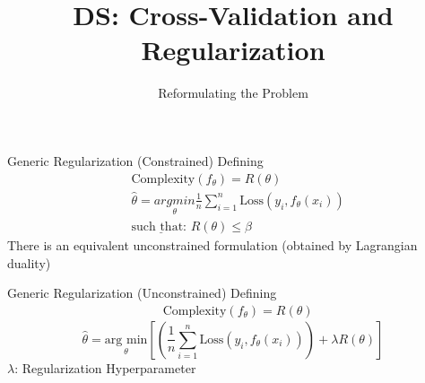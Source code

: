 \documentclass[aspectratio=169]{../latex_main/tntbeamer}  %
\title[Introduction]{DS: Cross-Validation and Regularization}
\subtitle{Reformulating the Problem}
\begin{document}
	
	\maketitle
	\begin{frame}{Generic Regularization (Constrained)}
	    Defining 
	    \begin{align*}
	        &\text{Complexity}(f_\theta) = R(\theta)\\
	        &\hat{\theta} = \underset{\theta}{arg min} \frac{1}{n}\sum\limits_{i=1}^n\text{Loss}(y_i,f_\theta(x_i))\\
	        &\underline{\text{such that: }} R(\theta) \leq \beta
	    \end{align*}
	    There is an equivalent unconstrained formulation (obtained by Lagrangian duality)

	\end{frame}
	
	
	\begin{frame}{Generic Regularization (Unconstrained)}
	    Defining 
	    \begin{align*}
	        &\text{Complexity}(f_\theta) = R(\theta)
	    \end{align*}
	    \begin{equation*}
	        \hat{\theta} = \underset{\theta}{\text{arg min}}\left[ \left(\frac{1}{n}\sum\limits_{i=1}^n\text{Loss}(y_i,f_\theta(x_i)) \right) + \lambda R(\theta)\right]
	    \end{equation*}
        $\lambda$: Regularization Hyperparameter

	\end{frame}
	
\end{document}

